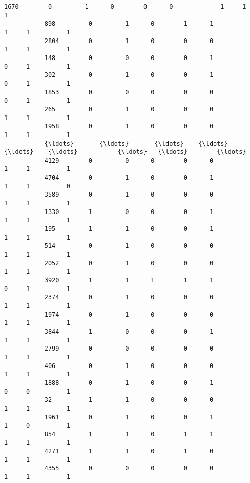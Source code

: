 \documentclass[11pt]{article}
\begin{document}
\begin{Verbatim}[commandchars=\\\{\}]
           1670        0         1      0        0      0             1     1          1   
           898         0         1      0        1      1             1     1          1   
           2804        0         1      0        0      0             1     1          1   
           148         0         0      0        0      1             0     1          1   
           302         0         1      0        0      1             0     1          1   
           1853        0         0      0        0      0             0     1          1   
           265         0         1      0        0      0             1     1          1   
           1958        0         1      0        0      0             1     1          1   
           {\ldots}       {\ldots}       {\ldots}    {\ldots}      {\ldots}    {\ldots}           {\ldots}   {\ldots}        {\ldots}   
           4129        0         0      0        0      0             1     1          1   
           4704        0         1      0        0      1             1     1          0   
           3589        0         1      0        0      0             1     1          1   
           1330        1         0      0        0      1             1     1          1   
           195         1         1      0        0      1             1     1          1   
           514         0         1      0        0      0             1     1          1   
           2052        0         1      0        0      0             1     1          1   
           3920        1         1      1        1      1             0     1          1   
           2374        0         1      0        0      0             1     1          1   
           1974        0         1      0        0      0             1     1          1   
           3844        1         0      0        0      1             1     1          1   
           2799        0         0      0        0      0             1     1          1   
           406         0         1      0        0      0             1     1          1   
           1888        0         1      0        0      1             0     0          1   
           32          1         1      0        0      0             1     1          1   
           1961        0         1      0        0      1             1     0          1   
           854         1         1      0        1      1             1     1          1   
           4271        1         1      0        1      0             1     1          1   
           4355        0         0      0        0      0             1     1          1   

\end{Verbatim}
\end{document}
